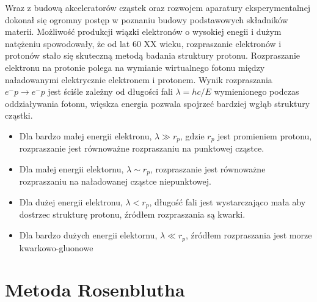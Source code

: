 \documentclass[11pt]{book}
\theoremstyle{definition}
\begin{document}
Wraz z budową akceleratorów cząstek oraz rozwojem aparatury eksperymentalnej dokonał się ogromny postęp w poznaniu budowy podstawowych składników materii. Możliwość produkcji wiązki elektronów o wysokiej enegii i dużym natężeniu spowodowały, że od lat 60 XX wieku, rozpraszanie elektronów i protonów stało się skuteczną metodą badania struktury protonu.
%
Rozpraszanie elektronu na protonie polega na wymianie wirtualnego fotonu między naładowanymi elektrycznie elektronem i protonem. Wynik rozpraszania $e^- p\rightarrow e^- p$ jest ściśle zależny od długości fali $\lambda = hc / E$ wymienionego podczas oddziaływania fotonu, więskza energia pozwala spojrzeć bardziej wgłąb struktury cząstki.
\begin{itemize}
	\item Dla bardzo małej energii elektronu, $\lambda \gg r_p$, gdzie $r_p$ jest promieniem protonu, rozpraszanie jest równoważne rozpraszaniu na punktowej cząstce.
	\item Dla małej energii elektornu, $\lambda \sim r_p$, rozpraszanie jest równoważne rozpraszaniu na naładowanej cząstce niepunktowej.
	\item Dla dużej energii elektronu, $\lambda < r_p$, długość fali jest wystarczająco mała aby dostrzec strukturę protonu, źródłem rozpraszania są kwarki.
	\item Dla bardzo dużych energii elektornu, $\lambda \ll r_p$, źródłem rozpraszania jest morze kwarkowo-gluonowe
\end{itemize}

\section{Metoda Rosenblutha}
\end{document}
